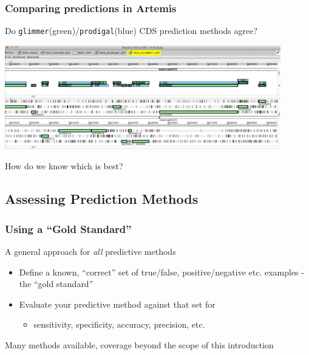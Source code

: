 \documentclass[table]{beamer}
\begin{document}
    \begin{frame}
     \frametitle{Comparing predictions in Artemis}
     Do \texttt{glimmer}(green)/\texttt{prodigal}(blue) CDS prediction methods agree?
      \begin{center}
        \includegraphics[width=0.9\textwidth]{images/artemis_cdspred4}     
      \end{center}
      How do we know which is best?
    \end{frame}

    \subsection{Assessing Prediction Methods}
    \begin{frame}
     \frametitle{Using a ``Gold Standard''}
     A general approach for \emph{all} predictive methods
     \begin{itemize}
       \item Define a known, ``correct'' set of true/false, positive/negative etc. examples - the ``gold standard''
       \item Evaluate your predictive method against that set for
       \begin{itemize}
         \item sensitivity, specificity, accuracy, precision, etc.
       \end{itemize}
     \end{itemize}
     Many methods available, coverage beyond the scope of this introduction
   \end{frame}
\end{document}
